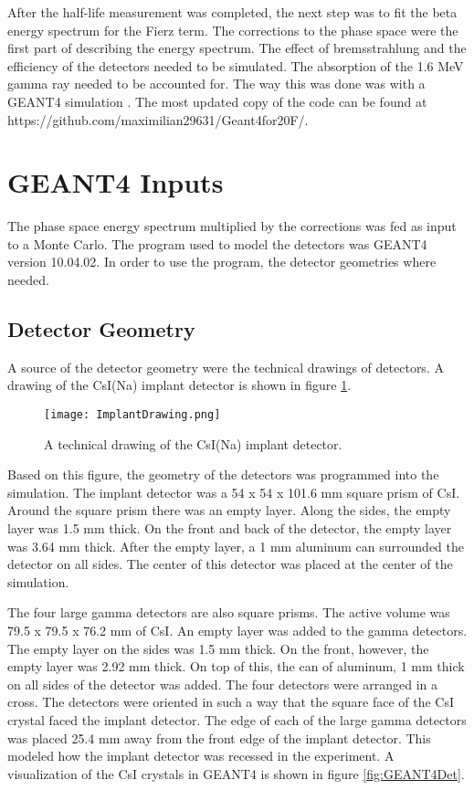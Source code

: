 \documentclass[../MaxHughesThesis.tex]{subfiles}
\begin{document}
After the half-life measurement was completed, the next step was to fit the beta energy spectrum for the Fierz term. 
The corrections to the phase space were the first part of describing the energy spectrum.  
The effect of bremsstrahlung and the efficiency of the detectors needed to be simulated.
The absorption of the 1.6 MeV gamma ray needed to be accounted for. 
The way this was done was with a GEANT4 simulation \cite{Ago03}.
The most updated copy of the code can be found at https://github.com/maximilian29631/Geant4for20F/.


\section{GEANT4 Inputs}
The phase space energy spectrum multiplied by the corrections was fed as input to a Monte Carlo.
The program used to model the detectors was GEANT4 version 10.04.02.
In order to use the program, the detector geometries where needed.

\subsection{Detector Geometry}
A source of the detector geometry were the technical drawings of detectors. 
A drawing of the CsI(Na) implant detector is shown in figure \ref{fig:ImplantTech}.
\begin{figure}[!htb]
	\centerline{\texttt{[image: ImplantDrawing.png]}}
	\caption{A technical drawing of the CsI(Na) implant detector.}
	\label{fig:ImplantTech}
\end{figure}
Based on this figure, the geometry of the detectors was programmed into the simulation.
The implant detector was a 54 x 54 x 101.6 mm square prism of CsI.
Around the square prism there was an empty layer.
Along the sides, the empty layer was 1.5 mm thick.
On the front and back of the detector, the empty layer was 3.64 mm thick.
After the empty layer, a 1 mm aluminum can surrounded the detector on all sides.  
The center of this detector was placed at the center of the simulation.

The four large gamma detectors are also square prisms.
The active volume was 79.5 x 79.5 x 76.2 mm of CsI.
An empty layer was  added to the gamma detectors.
The empty layer on the sides was 1.5 mm thick.
On the front, however, the empty layer was 2.92 mm thick.
On top of this, the can of aluminum, 1 mm thick on all sides of the detector was added.
The four detectors were arranged in a cross.
The detectors were oriented in such a way that the square face of the CsI crystal faced the implant detector. 
The edge of each of the large gamma detectors was placed 25.4 mm away from the front edge of the implant detector.
This modeled how the implant detector was recessed in the experiment.
A visualization of the CsI crystals in GEANT4 is shown in figure \ref{fig:GEANT4Det}.
\end{document}
